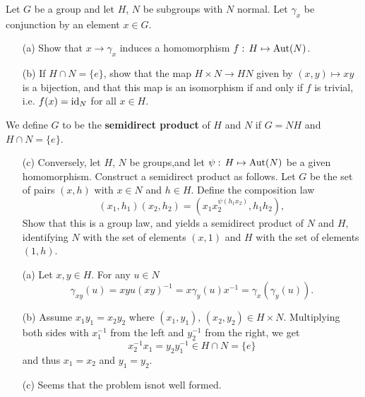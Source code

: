 \documentclass[12pt]{book}
\newcommand{\eG}{\ensuremath{\{e\}}}
\def\Aut{\mathop{\rm Aut}\nolimits}
\def\id{\mathop{\rm id}\nolimits}
\newcounter{myenumi}
\newenvironment{myenumerate}
{\begin{enumerate}
 \setcounter{enumi}{\themyenumi}
}
{\setcounter{myenumi}{\theenumi}
 \end{enumerate}}
\begin{document}
\begin{myenumerate}


\begin{excopy}
Let $G$ be a group and let $H$, $N$ be subgroups with $N$ normal.
Let \(\gamma_x\) be conjunction by an element \(x\in G\).
\begin{itemize}
 \item[(a)] Show that \(x\rightarrow \gamma_x\) induces
    a homomorphism \(f:\,H\mapsto\Aut(N)\).
 \item[(b)] If \(H\cap N = \eG\), show that the map
    \(H \times N \rightarrow HN\) given by
    \((x,y) \mapsto xy\) is a bijection, and that this map
    is an isomorphism if and only if $f$ is trivial,
    i.e. \(f(x) = \id_N\) for all \(x\in H\).
\end{itemize}
We define $G$ to be the \textbf{semidirect product} of $H$ and $N$
if \(G=NH\) and \(H\cap N = \eG\).
\begin{itemize}
 \item[(c)] Conversely, let $H$, $N$ be groups,and let
   \(\psi:\,H\mapsto \Aut(N)\) be a given homomorphism.
  Construct a semidirect product as follows.
  Let $G$ be the set of pairs \((x,h)\) with \(x\in N\) and \(h\in H\).
  Define the composition law
  \begin{equation}
    (x_1,h_1)(x_2,h_2) = (x_1x_2^{\psi(h_1x_2)}, h_1h_2),
  \end{equation}
  Show that this is a group law, and yields a semidirect product of $N$ and $H$,
  identifying
       $N$ with the set of elements \((x,1)\)
   and $H$ with the set of elements \((1,h)\).
\end{itemize}
\end{excopy}

\begin{itemize}

 \item[(a)] Let \(x,y\in H\). For any \(u\in N\)
 \[\gamma_{xy}(u) = xyu(xy)^{-1} = x\gamma_y(u)x^{-1} = \gamma_x(\gamma_y(u)).\]
 \item[(b)]
    Assume \(x_1y_1 = x_2y_2\) where \((x_1,y_1),\,(x_2,y_2)\in H\times N\).
   Multiplying both sides with
    \(x_1^{-1}\) from the left and
    \(y_2^{-1}\) from the right, we get
     \[x_2^{-1}x_1 = y_2y_1^{-1} \in H\cap N = \eG\]
   and thus \(x_1 = x_2\)
   and  \(y_1 = y_2\).
 \item[(c)]
    Seems that the problem isnot well formed.


\end{itemize}


\end{myenumerate}
\end{document}
